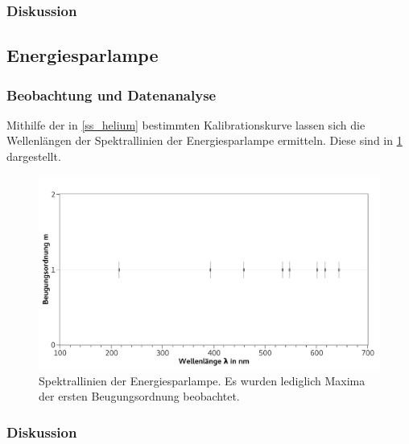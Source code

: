 \documentclass[
	a4paper,
	12pt,
	pagesize,
	ngerman
]{scrartcl}
\begin{document}
	\subsubsection{Diskussion}
	
	\subsection{Energiesparlampe}
	\subsubsection{Beobachtung und Datenanalyse}
	Mithilfe der in \cref{ss_helium} bestimmten Kalibrationskurve lassen sich die Wellenlängen der Spektrallinien der Energiesparlampe ermitteln.
	Diese sind in \cref{fig_spar} dargestellt.


	\begin{figure}[H] 
		\includegraphics[width=1\textwidth]{fig_spar} 
		\centering
		\caption{Spektrallinien der Energiesparlampe. 
		Es wurden lediglich Maxima der ersten Beugungsordnung beobachtet.} %
		\label{fig_spar}
		\centering
	\end{figure}
	
	\subsubsection{Diskussion}
	
\end{document}
